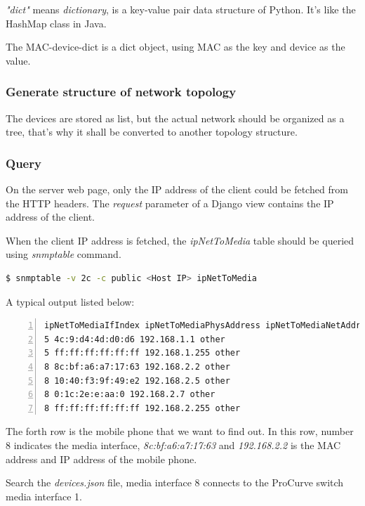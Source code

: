 \textit{"dict"} means \textit{dictionary}, is a key-value pair data structure of Python. It's like the HashMap class in Java.

The MAC-device-dict is a dict object, using MAC as the key and device as the value.

\subsubsection{Generate structure of network topology}

The devices are stored as list, but the actual network should be organized as a tree, that's why it shall be converted to another topology structure.

\subsubsection{Query}

On the server web page, only the IP address of the client could be fetched from the HTTP headers. The \textit{request} parameter of a Django view contains the IP address of the client.

When the client IP address is fetched, the \textit{ipNetToMedia} table should be queried using \textit{snmptable} command.

\begin{lstlisting}[language=bash, caption={List all connected devices}]
$ snmptable -v 2c -c public <Host IP> ipNetToMedia
\end{lstlisting}

A typical output listed below:

\begin{lstlisting}[numbers=left, firstnumber=1, numberfirstline=true]
ipNetToMediaIfIndex ipNetToMediaPhysAddress ipNetToMediaNetAddress ipNetToMediaType
5 4c:9:d4:4d:d0:d6 192.168.1.1 other
5 ff:ff:ff:ff:ff:ff 192.168.1.255 other
8 8c:bf:a6:a7:17:63 192.168.2.2 other
8 10:40:f3:9f:49:e2 192.168.2.5 other
8 0:1c:2e:e:aa:0 192.168.2.7 other
8 ff:ff:ff:ff:ff:ff 192.168.2.255 other
\end{lstlisting}

The forth row is the mobile phone that we want to find out. In this row, number 8 indicates the media interface, \textit{8c:bf:a6:a7:17:63} and \textit{192.168.2.2} is the MAC address and IP address of the mobile phone.

Search the \textit{devices.json} file, media interface 8 connects to the ProCurve switch media interface 1.

